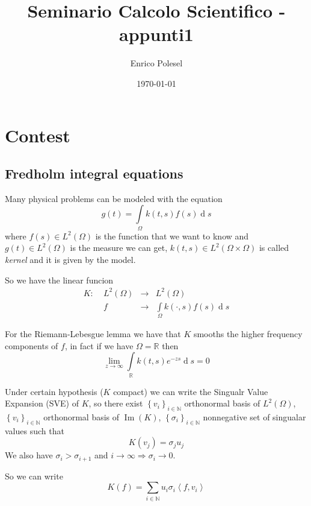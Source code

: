 \documentclass[a4paper,10pt]{article}
\title{Seminario Calcolo Scientifico - appunti1}
\author{Enrico Polesel}
\date{\today}
\theoremstyle{plain}
\theoremstyle{definition}
\theoremstyle{remark}
\newcommand{\set}[1]{\left\{#1\right\}}
\newcommand{\ang}[1]{\left<#1\right>}
\newcommand{\intl}{\int \limits}
\DeclareMathOperator{\de}{d}
\DeclareMathOperator{\im}{Im}
\begin{document}
\maketitle

\section{Contest}
\label{sec:contest}

\subsection{Fredholm integral equations}
\label{sec:fredholm}

Many physical problems can be modeled with the equation
\begin{equation}
  \label{eq:fredholm}
  g(t) = \intl _{\Omega} k(t,s) f(s) \de s
\end{equation}
where $f(s)\in L^2(\Omega)$ is the function that we want to know and
$g(t)\in L^2(\Omega)$ is the measure we can get, $k(t,s) \in
L^2(\Omega \times \Omega)$ is called \textit{kernel} and it is given
by the model.

So we have the linear funcion
\[ \begin{matrix}
  K:\; &L^2(\Omega) &\longrightarrow &L^2(\Omega)\\
  & f &\longrightarrow & \intl _\Omega k(\cdot , s) f(s) \de s
  \end{matrix}
\]

For the Riemann-Lebesgue lemma we have that $K$ smooths the higher
frequency components of $f$, in fact if we have $\Omega = \mathbb{R}$
then
\[ \lim _{z \to \infty} \intl _\mathbb{R} k(t,s) e^{-zs} \de s = 0 \]

Under certain hypothesis ($K$ compact) we can write the Singualr Value
Expansion (SVE) of $K$, so there exist $\set{v_i}_{i\in \mathbb{N}}$
orthonormal basis of $L^2(\Omega)$, $\set{v_i}_{i\in \mathbb{N}}$
orthonormal basis of $\im(K)$, $\set{\sigma _i}_{i\in \mathbb{N}}$
nonnegative set of singualar values such that
\begin{equation}
  \label{eq:SVErealtion}
  K(v_j) = \sigma _j u_j
\end{equation}
We also have $\sigma _i > \sigma _{i+1}$ and $i \to \infty \Rightarrow
\sigma _i \to 0$.

So we can write
\begin{equation}
  \label{eq:SVE}
  K(f) = \sum _{i\in \mathbb{N}} u_i \sigma _i \ang{f,v_i}
\end{equation}
\end{document}
